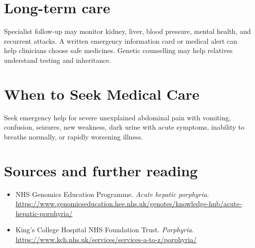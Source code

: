\section*{Long-term care}
Specialist follow-up may monitor kidney, liver, blood pressure, mental health, and recurrent attacks. A written emergency information card or medical alert can help clinicians choose safe medicines. Genetic counselling may help relatives understand testing and inheritance.

\section*{When to Seek Medical Care}
Seek emergency help for severe unexplained abdominal pain with vomiting, confusion, seizures, new weakness, dark urine with acute symptoms, inability to breathe normally, or rapidly worsening illness.

\section*{Sources and further reading}
\begin{itemize}
\item NHS Genomics Education Programme. \textit{Acute hepatic porphyria}. \url{https://www.genomicseducation.hee.nhs.uk/genotes/knowledge-hub/acute-hepatic-porphyria/}
\item King’s College Hospital NHS Foundation Trust. \textit{Porphyria}. \url{https://www.kch.nhs.uk/services/services-a-to-z/porphyria/}
\end{itemize}
